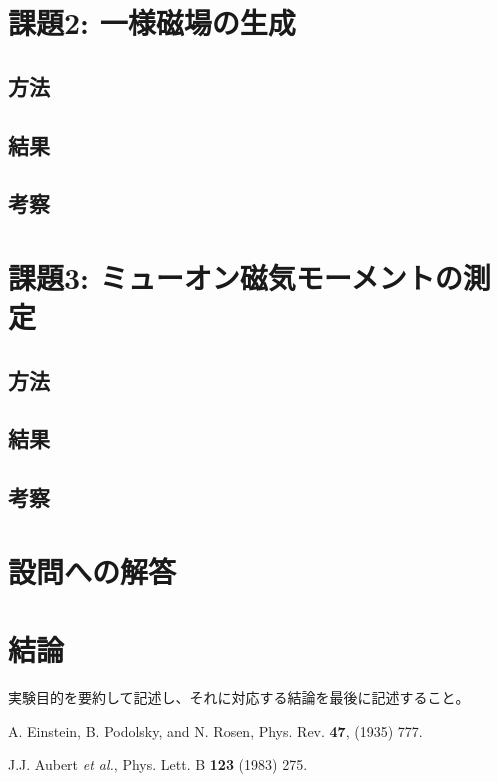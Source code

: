 \documentclass[uplatex,dvipdfmx,a4j,12pt]{jsarticle}
\begin{document}
\section{課題2: 一様磁場の生成}
\subsection{方法}

\subsection{結果}

\subsection{考察}


\section{課題3: ミューオン磁気モーメントの測定}
\subsection{方法}

\subsection{結果}

\subsection{考察}

\section{設問への解答}


\section{結論}

実験目的を要約して記述し、それに対応する結論を最後に記述すること。

\begin{thebibliography}{9}

        A. Einstein, B. Podolsky, and N. Rosen, 
        Phys. Rev. \textbf{47}, (1935) 777.

        J.J. Aubert \textit{et al.},
        Phys. Lett. B \textbf{123} (1983) 275.
    
\end{thebibliography}
\end{document}
